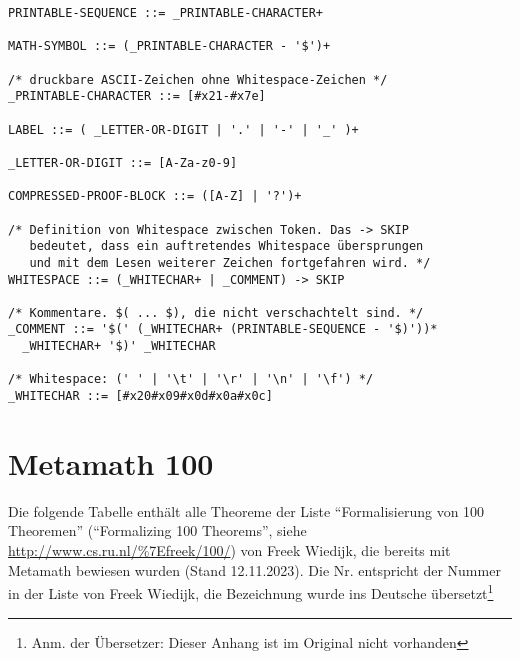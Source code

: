 \begin{verbatim}
PRINTABLE-SEQUENCE ::= _PRINTABLE-CHARACTER+

MATH-SYMBOL ::= (_PRINTABLE-CHARACTER - '$')+

/* druckbare ASCII-Zeichen ohne Whitespace-Zeichen */
_PRINTABLE-CHARACTER ::= [#x21-#x7e]

LABEL ::= ( _LETTER-OR-DIGIT | '.' | '-' | '_' )+

_LETTER-OR-DIGIT ::= [A-Za-z0-9]

COMPRESSED-PROOF-BLOCK ::= ([A-Z] | '?')+

/* Definition von Whitespace zwischen Token. Das -> SKIP
   bedeutet, dass ein auftretendes Whitespace übersprungen
   und mit dem Lesen weiterer Zeichen fortgefahren wird. */
WHITESPACE ::= (_WHITECHAR+ | _COMMENT) -> SKIP

/* Kommentare. $( ... $), die nicht verschachtelt sind. */
_COMMENT ::= '$(' (_WHITECHAR+ (PRINTABLE-SEQUENCE - '$)'))*
  _WHITECHAR+ '$)' _WHITECHAR

/* Whitespace: (' ' | '\t' | '\r' | '\n' | '\f') */
_WHITECHAR ::= [#x20#x09#x0d#x0a#x0c]
\end{verbatim}
%

\chapter{Metamath 100}%
\label{Metamath100}%

Die folgende Tabelle enthält alle Theoreme der Liste
"`Formalisierung von 100 Theoremen"' ("`Formalizing 100 Theorems"', siehe \url{http://www.cs.ru.nl/\%7Efreek/100/}) von Freek Wiedijk, die bereits mit Metamath bewiesen wurden (Stand 12.11.2023). Die Nr. entspricht der Nummer in der Liste von Freek Wiedijk, die Bezeichnung wurde ins Deutsche übersetzt\footnote{Anm. der Übersetzer: Dieser Anhang ist im Original nicht vorhanden}

